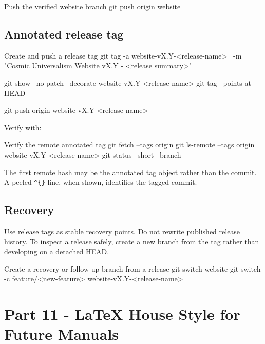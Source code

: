 \documentclass[11pt,letterpaper]{article}
\begin{document}
\begin{commandbox}{Push the verified website branch}
git push origin website
\end{commandbox}

\subsection{Annotated release tag}

\begin{commandbox}{Create and push a release tag}
git tag -a website-vX.Y-<release-name> \
  -m "Cosmic Universalism Website vX.Y - <release summary>"

git show --no-patch --decorate website-vX.Y-<release-name>
git tag --points-at HEAD

git push origin website-vX.Y-<release-name>
\end{commandbox}

Verify with:

\begin{commandbox}{Verify the remote annotated tag}
git fetch --tags origin
git ls-remote --tags origin website-vX.Y-<release-name>
git status --short --branch
\end{commandbox}

The first remote hash may be the annotated tag object rather than the commit.
A peeled \texttt{\^{}\{\}} line, when shown, identifies the tagged commit.

\subsection{Recovery}

Use release tags as stable recovery points. Do not rewrite published release
history. To inspect a release safely, create a new branch from the tag rather
than developing on a detached HEAD.

\begin{commandbox}{Create a recovery or follow-up branch from a release}
git switch website
git switch -c feature/<new-feature> website-vX.Y-<release-name>
\end{commandbox}

\section{Part 11 - LaTeX House Style for Future Manuals}
\end{document}

